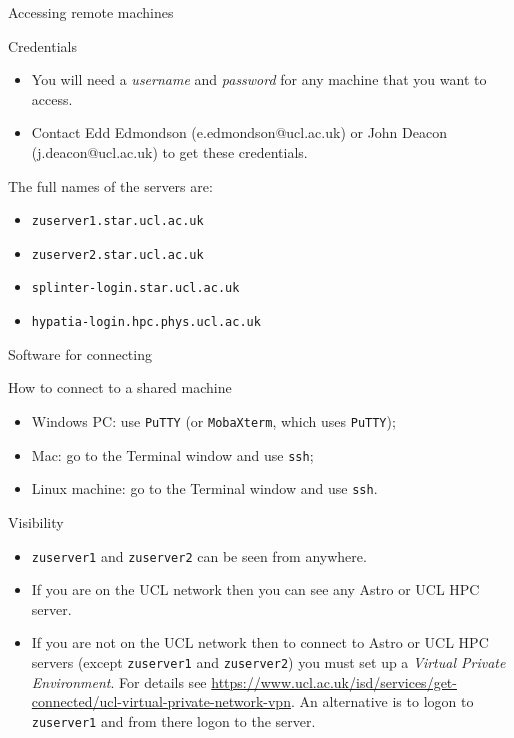 \documentclass{beamer}
\newcommand{\command}[1]{\colorbox{light-gray}{\texttt{#1}}}
\begin{document}
\begin{frame}{Accessing remote machines}
  \begin{block}{Credentials}
    \begin{itemize}
      \item You will need a \textit{username} and \textit{password} for any machine that you want to access.
      \item Contact Edd Edmondson (e.edmondson@ucl.ac.uk) or John Deacon (j.deacon@ucl.ac.uk) to get these credentials.
    \end{itemize}
  \end{block}
  \begin{block}{The full names of the servers are:}
    \begin{itemize}
      \item \texttt{zuserver1.star.ucl.ac.uk}
      \item \texttt{zuserver2.star.ucl.ac.uk}
      \item \texttt{splinter-login.star.ucl.ac.uk}
      \item \texttt{hypatia-login.hpc.phys.ucl.ac.uk}
    \end{itemize}
  \end{block}
\end{frame}


\begin{frame}{Software for connecting}
  \begin{block}{How to connect to a shared machine}
    \begin{itemize}
      \item Windows PC: use \command{PuTTY} (or \command{MobaXterm}, which uses \command{PuTTY});
      \item Mac: go to the Terminal window and use \command{ssh};
      \item Linux machine: go to the Terminal window and use \command{ssh}.
    \end{itemize}
  \end{block}
\end{frame}

\begin{frame}{Visibility}
  \begin{block}{}
    \begin{itemize}
    \item \texttt{zuserver1} and \texttt{zuserver2} can be seen from anywhere.
    \item If you are on the UCL network then you can see any Astro or UCL HPC server.
    \item If you are not on the UCL network then to connect to Astro or UCL HPC servers (except \texttt{zuserver1} and \texttt{zuserver2}) you must set up a \textit{Virtual Private Environment}. For details see \url{https://www.ucl.ac.uk/isd/services/get-connected/ucl-virtual-private-network-vpn}. An alternative is to logon to \texttt{zuserver1} and from there logon to the server.
    \end{itemize}
  \end{block}
\end{frame}
\end{document}
